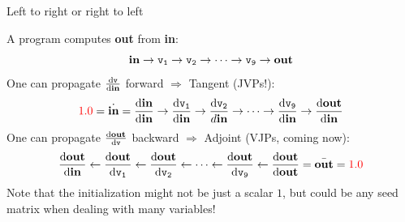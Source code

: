 \documentclass[12pt,xcolor={table}]{beamer}
\newcommand{\dif}[1]{\mathrm{d} #1}
\begin{document}
\begin{frame}{Left to right or right to left}

A program computes {\bf out} from {\bf in}:
\begin{equation*}
{\textbf{in}} \rightarrow {\tt v_1} \rightarrow {\tt v_2} \rightarrow \cdots \rightarrow {\tt v_9} \rightarrow {\textbf{out}}
\end{equation*}
One can propagate ${\dif{\tt v}\over \dif{\bf in}}$ forward $\Rightarrow$ Tangent (JVPs!):
\begin{equation*}
{\color{red}1.0} = \dot{\textbf{in}} = \frac{\dif{\textbf{in}}}{\dif{\textbf{in}}} \rightarrow \frac{\dif{\tt v_1}}{\dif{\textbf{in}}} \rightarrow\frac{\dif{\tt v_2}}{d\textbf{in}} \rightarrow \cdots \rightarrow \frac{\dif{\tt v_9}}{\dif\textbf{in}} \rightarrow \frac{\dif{\textbf{out}}}{\dif{\textbf{in}}}
\end{equation*}
One can propagate ${\dif{\bf out}\over \dif{\tt v}}$ backward $\Rightarrow$ Adjoint (VJPs, coming now):
\begin{equation*}
\frac{{\dif{\textbf{out}}}}{\dif{\textbf{in}}} \leftarrow \frac{\dif{\textbf{out}}}{\dif{\tt v_1}} \leftarrow \frac{\dif{\textbf{out}}}{\dif{\tt v_2}} \leftarrow \cdots \leftarrow \frac{{\dif\textbf{out}}}{\dif{\tt v_9}} \leftarrow \frac{\dif{\textbf{out}}}{\dif{\textbf{out}}} = \bar{\textbf{out}} = {\color{red}1.0}
\end{equation*}
Note that the initialization might not be just a scalar $1$, but could be any seed matrix when dealing with many variables!
\end{frame}
\end{document}
